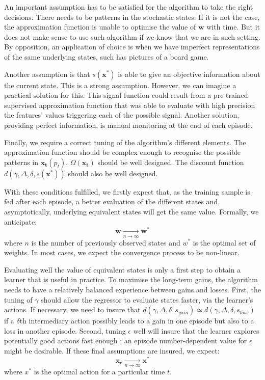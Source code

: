 \documentclass[letterpaper, 10.5 pt, conference]{ieeeconf}
\newcommand{\B}[1]{\mathbf{#1}}
\begin{document}
An important assumption has to be satisfied for the algorithm to take the right decisions. There needs to be patterns in the stochastic states. If it is not the case, the approximation function is unable to optimise the value of $\B{w}$ with time. But it does not make sense to use such algorithm if we know that we are in such setting. By opposition, an application of choice is when we have imperfect representations of the same underlying states, such has pictures of a board game.

Another assumption is that $s(\B{x^*})$ is able to give an objective information about the current state. This is a strong assumption. However, we can imagine a practical solution for this. This signal function could result from a pre-trained supervised approximation function that was able to evaluate with high precision the features’ values triggering each of the possible signal. Another solution, providing perfect information, is manual monitoring at the end of each episode.

Finally, we require a correct tuning of the algorithm’s different elements. The approximation function should be complex enough to recognise the possible patterns in $\B{x_t}(p_t)$. $\Omega(\B{x_t})$ should be well designed. The discount function $d(\gamma, \Delta, \delta, s(\B{x^*}))$ should also be well designed.

With these conditions fulfilled, we firstly expect that, as the training sample is fed after each episode, a better evaluation of the different states and, asymptotically, underlying equivalent states will get the same value. Formally, we anticipate:
$$\B{w} \xrightarrow[n \to \infty]{} \B{w^*}$$
where $n$ is the number of previously observed states and $w^*$ is the optimal set of weights. In most cases, we expect the convergence process to be non-linear.

Evaluating well the value of equivalent states is only a first step to obtain a learner that is useful in practice. To maximise the long-term gains, the algorithm needs to have a relatively balanced experience between gains and losses. First, the tuning of $\gamma$ should allow the regressor to evaluate states faster, via the learner's actions. If necessary, we need to insure that
$d(\gamma, \Delta, \delta, s_{gain}) \simeq d(\gamma, \Delta, \delta, s_{loss})$
if a $\delta$th intermediary action possibly leads to a gain in one episode but also to a loss in another episode. Second, tuning $\epsilon$ well will insure that the learner explores potentially good actions fast enough ; an episode number-dependent value for $\epsilon$ might be desirable. If these final assumptions are insured, we expect:
$$\B{x_c} \xrightarrow[n \to \infty]{} \B{x^*}$$
where $x^*$ is the optimal action for a particular time $t$.
\end{document}

